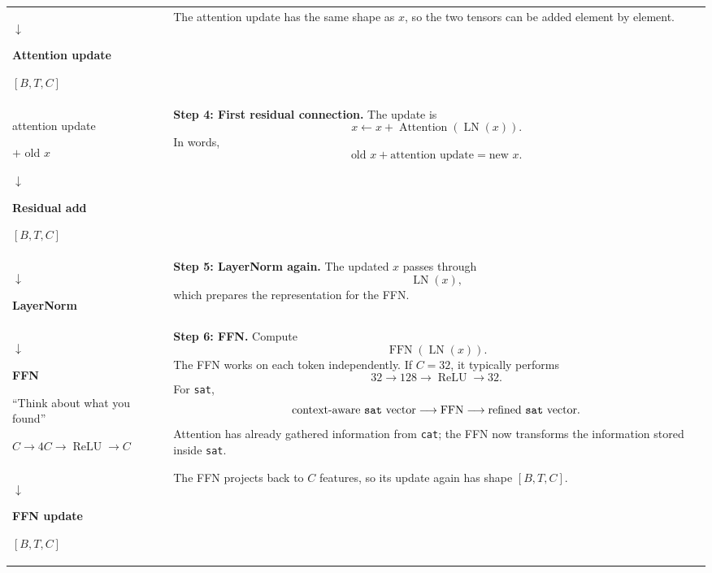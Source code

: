 \begin{longtable}{@{}p{}p{}@{}}
  {\centering\sffamily
    \(\downarrow\)\par
    \textbf{Attention update}\par
    \([B,T,C]\)\par}
  &
  The attention update has the same shape as \(x\), so the two tensors can be
  added element by element.
  \\

  {\centering\sffamily
    attention update\par
    \(+\) old \(x\)\par
    \(\downarrow\)\par
    \textbf{Residual add}\par
    \([B,T,C]\)\par}
  &
  \textbf{Step 4: First residual connection.}
  The update is
  \[
    x\leftarrow x+
    \operatorname{Attention}\!\left(\operatorname{LN}(x)\right).
  \]
  In words,
  \[
    \text{old }x+\text{attention update}=\text{new }x.
  \]
  \\

  {\centering\sffamily
    \(\downarrow\)\par
    \textbf{LayerNorm}\par}
  &
  \textbf{Step 5: LayerNorm again.}
  The updated \(x\) passes through
  \[
    \operatorname{LN}(x),
  \]
  which prepares the representation for the FFN.
  \\

  {\centering\sffamily
    \(\downarrow\)\par
    \textbf{FFN}\par
    ``Think about what you found''\par
    \(C\rightarrow4C\rightarrow\operatorname{ReLU}\rightarrow C\)\par}
  &
  \textbf{Step 6: FFN.}
  Compute
  \[
    \operatorname{FFN}\!\left(\operatorname{LN}(x)\right).
  \]
  The FFN works on each token independently. If \(C=32\), it typically
  performs
  \[
    32\longrightarrow128
    \longrightarrow\operatorname{ReLU}
    \longrightarrow32.
  \]
  For \texttt{sat},
  \[
    \text{context-aware \texttt{sat} vector}
    \longrightarrow\operatorname{FFN}
    \longrightarrow\text{refined \texttt{sat} vector}.
  \]
  Attention has already gathered information from \texttt{cat}; the FFN now
  transforms the information stored inside \texttt{sat}.
  \\

  {\centering\sffamily
    \(\downarrow\)\par
    \textbf{FFN update}\par
    \([B,T,C]\)\par}
  &
  The FFN projects back to \(C\) features, so its update again has shape
  \([B,T,C]\).
  \\


\end{longtable}
